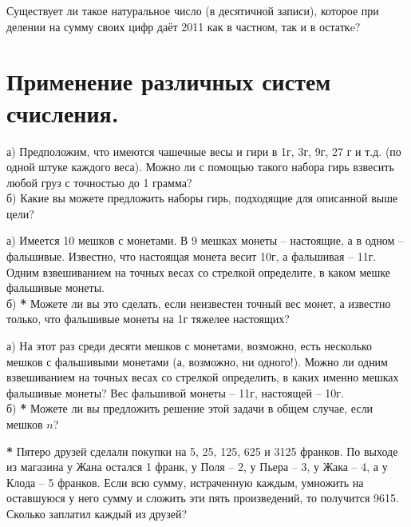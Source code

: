 \begin{thm}
    Существует ли такое натуральное число (в десятичной записи), которое при делении на сумму своих цифр даёт 2011 как в частном, так и в остаткe?
\end{thm}

\newpage

\section{Применение различных систем счисления.}

\begin{thm}
а) Предположим, что имеются чашечные весы и гири в 1г, 3г, 9г, 27 г и т.д. (по одной штуке каждого веса). Можно ли с помощью такого набора гирь взвесить любой груз с точностью до 1 грамма?  
\\
б) Какие вы можете предложить наборы гирь, подходящие для описанной выше цели?  
\end{thm}

\begin{thm}
а) Имеется 10 мешков с монетами. В 9 мешках монеты -- настоящие, а в одном -- фальшивые. Известно, что настоящая монета весит 10г, а фальшивая -- 11г. Одним взвешиванием на точных весах со стрелкой определите, в каком мешке фальшивые монеты. 
\\
б) \textbf{*}  Можете ли вы это сделать, если неизвестен точный вес монет, а известно только, что фальшивые монеты на 1г тяжелее настоящих?
\end{thm}

\begin{thm}
а) На этот раз среди десяти мешков с монетами, возможно, есть несколько мешков с фальшивыми монетами (а, возможно, ни одного!). Можно ли одним взвешиванием на точных весах со стрелкой определить, в каких именно мешках фальшивые монеты? Вес фальшивой монеты -- 11г, настоящей -- 10г.
\\
б) \textbf{*} Можете ли вы предложить решение этой задачи в общем случае, если мешков $n$?
\end{thm}

\begin{thm} \textbf{*}
Пятеро друзей сделали покупки на 5, 25, 125, 625 и 3125 франков. По выходе из магазина у
Жана остался 1 франк, у Поля -- 2, у Пьера -- 3, у Жака -- 4, а у Клода -- 5 франков. Если всю сумму, истраченную каждым, умножить на оставшуюся у него сумму и сложить эти пять произведений, то получится 9615. Сколько заплатил каждый из друзей?
\end{thm}

